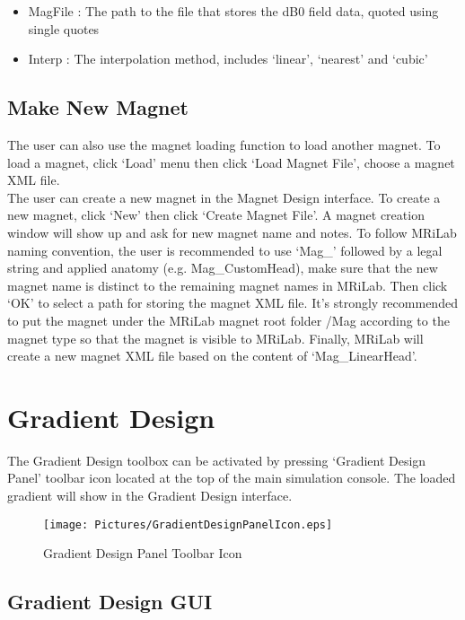 \documentclass{book}%
\begin{document}
\begin{itemize}
	\item MagFile : The path to the file that stores the dB0 field data, quoted using single quotes
	\item Interp : The interpolation method, includes `linear', `nearest' and `cubic'
\end{itemize}

\subsection{Make New Magnet}

The user can also use the magnet loading function to load another magnet. To load a magnet, click `Load' menu then click `Load Magnet File', choose a magnet XML file.\\

The user can create a new magnet in the Magnet Design interface. To create a new magnet, click `New' then click `Create Magnet File'. A magnet creation window will show up and ask for new magnet name and notes. To follow MRiLab naming convention, the user is recommended to use `Mag\_' followed by a legal string and applied anatomy (e.g. Mag\_CustomHead), make sure that the new magnet name is distinct to the remaining magnet names in MRiLab. Then click `OK' to select a path for storing the magnet XML file. It's strongly recommended to put the magnet under the MRiLab magnet root folder /Mag according to the magnet type so that the magnet is visible to MRiLab. Finally, MRiLab will create a new magnet XML file based on the content of `Mag\_LinearHead'.

\section{Gradient Design}

The Gradient Design toolbox can be activated by pressing `Gradient Design Panel' toolbar icon located at the top of the main simulation console. The loaded gradient will show in the Gradient Design interface.

\begin{figure}[htbp]
	\centering
		\texttt{[image: Pictures/GradientDesignPanelIcon.eps]}
	\caption{Gradient Design Panel Toolbar Icon}
	\label{fig:GradientDesignPanelIcon}
\end{figure}

\subsection{Gradient Design GUI}
\end{document}
